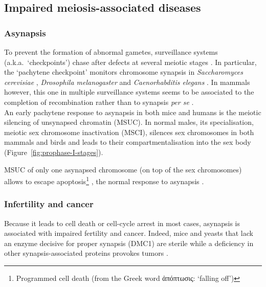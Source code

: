 \subsection{Impaired meiosis-associated diseases}

\subsubsection{Asynapsis}
To prevent the formation of abnormal gametes, surveillance systems (a.k.a.\ ‘checkpoints’) chase after defects at several meiotic stages \citep[reviewed in][]{handel2010genetics}.
In particular, the ‘pachytene checkpoint’ \citep{roeder2000pachytene} monitors chromosome synapsis in \textit{Saccharomyces cerevisiae} \citep{wu2006two}, \textit{Drosophila melanogaster} \citep{ghabrial1999activation,abdu2002activation} and \textit{Caenorhabditis elegans} \citep{bhalla2005conserved}.
In mammals however, this one in multiple surveillance systems \citep{barchi2005surveillance} seems to be associated to the completion of recombination rather than to synapsis \textit{per se} \citep{li2007mouse}.\\

An early pachytene response to asynapsis in both mice \citep{baarends2005silencing,turner2005silencing} and humans \citep{ferguson2008silencing,sciurano2007asynaptic} is the meiotic silencing of unsynapsed chromatin (MSUC). 
In normal males, its specialisation, meiotic sex chromosome inactivation (MSCI), silences sex chromosomes in both mammals and birds \citep{schoenmakers2009female} and leads to their compartmentalisation into the sex body (Figure~\ref{fig:prophase-I-stages}).

MSUC of only one asynapsed chromosome (on top of the sex chromosomes) allows to escape apoptosis\footnote{Programmed cell death (from the Greek word \textgreek{ἀπόπτωσις}: ‘falling off’)} \citep{mahadevaiah2008extensive,jaramillo-lambert2010single}, the normal response to asynapsis \citep{hochwagen2006checking}.


\subsubsection{Infertility and cancer}
Because it leads to cell death or cell-cycle arrest in most cases, asynapsis is associated with impaired fertility and cancer.
Indeed, mice and yeasts that lack an enzyme decisive for proper synapsis (DMC1) are sterile \citep{bannister2007dominant} while a deficiency in other synapsis-associated proteins provokes tumors \citep{moynahan2002cancer, jasin2002homologous}.\\

